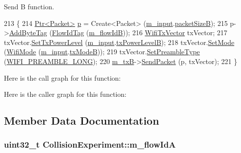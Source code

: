 Send B function. 


\begin{DoxyCode}
213 \{
214   \hyperlink{classns3_1_1Ptr}{Ptr<Packet>} \hyperlink{lte__link__budget_8m_ac9de518908a968428863f829398a4e62}{p} = Create<Packet> (\hyperlink{classCollisionExperiment_a735b0105c62702501ae9e4b473795682}{m\_input}.\hyperlink{structCollisionExperiment_1_1Input_ad5c970b5ed3681880d7c4b4501e26134}{packetSizeB});
215   p->\hyperlink{classns3_1_1Packet_ad5997caea8c22757acade2fcb4d7daca}{AddByteTag} (\hyperlink{classns3_1_1FlowIdTag}{FlowIdTag} (\hyperlink{classCollisionExperiment_a39fe5cdf6536df540d308abba68c2c0a}{m\_flowIdB}));
216   \hyperlink{classns3_1_1WifiTxVector}{WifiTxVector} txVector;
217   txVector.\hyperlink{classns3_1_1WifiTxVector_a25743cd89a5cb95ec22a9e584fa044f3}{SetTxPowerLevel} (\hyperlink{classCollisionExperiment_a735b0105c62702501ae9e4b473795682}{m\_input}.\hyperlink{structCollisionExperiment_1_1Input_a1e42b824a7acbea5e22bb14c6a1c18c8}{txPowerLevelB});
218   txVector.\hyperlink{classns3_1_1WifiTxVector_af39f17fec348c22f8c963bcb6bb5fc53}{SetMode} (\hyperlink{classns3_1_1WifiMode}{WifiMode} (\hyperlink{classCollisionExperiment_a735b0105c62702501ae9e4b473795682}{m\_input}.\hyperlink{structCollisionExperiment_1_1Input_ae702c9a6f996817fed879b1c01c9afc5}{txModeB}));
219   txVector.\hyperlink{classns3_1_1WifiTxVector_afa5117513e1a7bfa717c3d7556192525}{SetPreambleType} (\hyperlink{group__wifi_gga5e94a56cb338a14ffbbb19c6a41251eba12f3d9468d1630bd38bbef20df1e3eda}{WIFI\_PREAMBLE\_LONG});
220   \hyperlink{classCollisionExperiment_aa84222ca77a56ddb4cc28475f64a57b0}{m\_txB}->\hyperlink{classns3_1_1WifiPhy_a4caf22eb334a9caca21ec37d90a74ce2}{SendPacket} (p, txVector);
221 \}
\end{DoxyCode}


Here is the call graph for this function\+:




Here is the caller graph for this function\+:




\subsection{Member Data Documentation}
\subsubsection[{\texorpdfstring{m\+\_\+flow\+IdA}{m_flowIdA}}]{\setlength{\rightskip}{0pt plus 5cm}uint32\+\_\+t Collision\+Experiment\+::m\+\_\+flow\+IdA\hspace{0.3cm}{\ttfamily [private]}}\hypertarget{classCollisionExperiment_aea147790587130f8326370d34589b336}{}\label{classCollisionExperiment_aea147790587130f8326370d34589b336}



